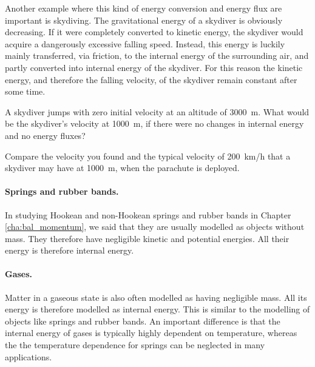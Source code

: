 \documentclass[a4paper,12pt,%
onecolumn,oneside,titlepage,%
british%
]{memoir}
\renewcommand*{\|}[1][]{\nonscript\:#1\vert\nonscript\:\mathopen{}}
\newcommand*{\chap}{Chapter}%
\begin{document}
Another example where this kind of energy conversion and energy flux are important is skydiving. The gravitational energy of a skydiver is obviously decreasing. If it were completely converted to kinetic energy, the skydiver would acquire a dangerously excessive falling speed. Instead, this energy is luckily mainly transferred, via friction, to the internal energy of the surrounding air, and partly converted into internal energy of the skydiver. For this reason the kinetic energy, and therefore the falling velocity, of the skydiver remain constant after some time.
%
%

\begin{exercise}
  A skydiver jumps with zero initial velocity at an altitude of \qty{3000}{m}. What would be the skydiver's velocity at \qty{1000}{m}, if there were no changes in internal energy and no energy fluxes?

  Compare the velocity you found and the typical velocity of \qty{200}{km/h} that a skydiver may have at \qty{1000}{m}, when the parachute is deployed.
\end{exercise}

\paragraph{Springs and rubber bands.}

In studying Hookean and non-Hookean springs and rubber bands in \chap\,\ref{cha:bal_momentum}, we said that they are usually modelled as objects without mass. They therefore have negligible kinetic and potential energies. All their energy is therefore internal energy.

\paragraph{Gases.}
Matter in a gaseous state is also often modelled as having negligible mass. All its energy is therefore modelled as internal energy. This is similar to the modelling of objects like springs and rubber bands. An important difference is that the internal energy of gases is typically highly dependent on temperature, whereas the the temperature dependence for springs can be neglected in many applications.
\end{document}
